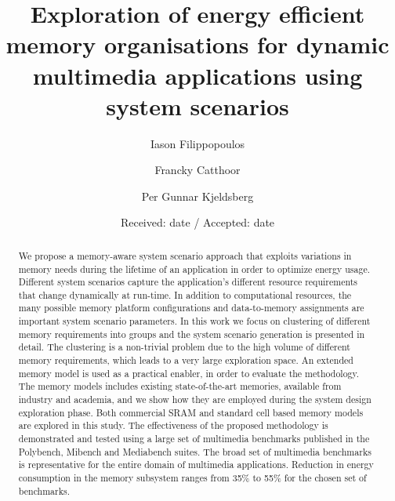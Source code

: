 \documentclass[smallcondensed]{svjour3}
\begin{document}
\title{Exploration of energy efficient memory organisations for dynamic multimedia applications using system scenarios}


\author{Iason Filippopoulos \and Francky Catthoor \and Per Gunnar Kjeldsberg}



\date{Received: date / Accepted: date}


\maketitle

\begin{abstract}
We propose a memory-aware system scenario approach that exploits variations in memory needs during the lifetime of an application in order to optimize energy usage. 
Different system scenarios capture the application's different resource requirements that change dynamically at run-time. 
In addition to computational resources, the many possible memory platform configurations and data-to-memory assignments are important system scenario parameters. 
In this work we focus on clustering of different memory requirements into groups and the system scenario generation is presented in detail.
The clustering is a non-trivial problem due to the high volume of different memory requirements, which leads to a very large exploration space.
An extended memory model is used as a practical enabler, in order to evaluate the methodology. 
The memory models includes existing state-of-the-art memories, available from industry and academia, and we show how they are employed during the system design exploration phase. 
Both commercial SRAM and standard cell based memory models are explored in this study. 
The effectiveness of the proposed methodology is demonstrated and tested using a large set of multimedia benchmarks published in the Polybench, Mibench and Mediabench suites.
The broad set of multimedia benchmarks is representative for the entire domain of multimedia applications.
Reduction in energy consumption in the memory subsystem ranges from 35\% to 55\% for the chosen set of benchmarks.
\end{abstract}
\end{document}

